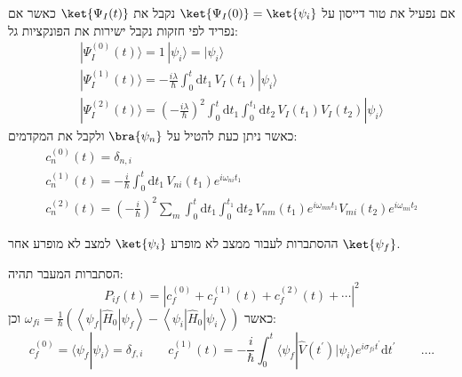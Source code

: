 \documentclass{tstextbook}
\begin{document}
\begin{proposition}
אם נפעיל את טור דייסון על \(\ket{\Psi_{I}(0)}=\ket{\psi_{i}}\) נקבל את \(\ket{\Psi_{I}(t)}\) כאשר אם נפריד לפי חזקות נקבל ישירות את הפונקציות גל:
\begin{gather*}|\Psi_{I}^{(0)}(t)\rangle=1\,|\psi_{i}\rangle=|\psi_{i}\rangle\\ |\Psi_{I}^{(1)}(t)\rangle=-\frac{i\lambda}{\hbar}\int_{0}^{t}\mathrm{d} t_{1}\,V_{I}(t_{1})|\psi_{i}\rangle\\|\Psi_{I}^{(2)}(t)\rangle=\left(-\frac{i\lambda}{\hbar}\right)^{2}\int_{0}^{t}\mathrm{d} t_{1}\int_{0}^{t_{1}}\mathrm{d} t_{2}\,V_{I}(t_{1})V_{I}(t_{2})|\psi_{i}\rangle 
\end{gather*}
כאשר ניתן כעת להטיל על \(\bra{\psi_{n}}\) ולקבל את המקדמים:
\begin{gather*}c_{n}^{(0)}(t)=\delta_{n,i}\\ c_{n}^{(1)}(t)=-\frac{i}{\hbar}\int_{0}^{t}\mathrm{d} t_{1}\,V_{n i}(t_{1})e^{i\omega_{n i}t_{1}}\\c_{n}^{(2)}(t)=\left(-\frac{i}{\hbar}\right)^{2}\sum_{m}\int_{0}^{t}\mathrm{d} t_{1}\int_{0}^{t_{1}}\mathrm{d} t_{2}\,V_{n m}(t_{1})e^{i\omega_{m n}t_{1}}V_{m i}(t_{2})e^{i\omega_{m i}t_{2}} 
\end{gather*}

\end{proposition}
\begin{definition}
ההסתברות לעבור ממצב לא מופרע \(\ket{\psi_{i}}\) למצב לא מופרע אחר \(\ket{\psi_{f}}\).

\end{definition}
\begin{proposition}
הסתברות המעבר תהיה:
$$P_{i f}(t)=\left|c_{f}^{(0)}+c_{f}^{(1)}(t)+c_{f}^{(2)}(t)+\cdots\right|^{2}$$
כאשר \(\omega_{fi}=\frac{1}{\hbar}\left(\left\langle \psi_{f}|\hat{H}_{0}|\psi_{f} \right\rangle-\left\langle \psi_{i}|\hat{H}_{0}|\psi_{i} \right\rangle\right)\) וכן:
$$c_{f}^{(0)}=\langle\psi_{f}|\psi_{i}\rangle=\delta_{f,i}\qquad c_{f}^{(1)}(t)=-\frac{i}{\hbar}\int_{0}^{t}\langle\psi_{f}|\hat{V}(t^{\prime})|\psi_{i}\rangle e^{i\sigma_{f i}t^{\prime}}\mathrm{d}t^{\prime}\qquad  \ldots.$$

\end{proposition}
\end{document}
